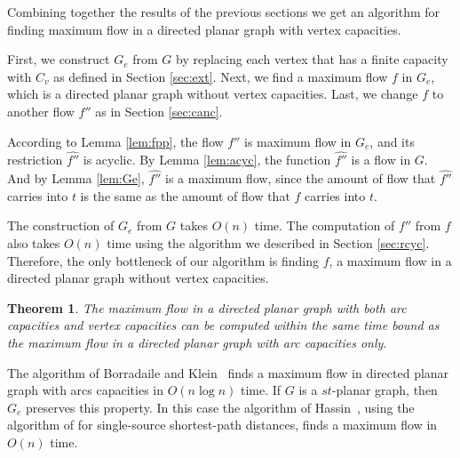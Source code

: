 \documentclass[a4paper,11pt]{article}
\newtheorem{theorem}{Theorem}[section]
\begin{document}
Combining together the results of the previous sections we get an
algorithm for finding maximum flow in a directed planar graph with
vertex capacities.

First, we construct $G_e$ from $G$ by replacing each vertex that has a
finite capacity with $C_v$ as defined in Section \ref{sec:ext}. Next,
we find a maximum flow $f$ in $G_e$, which is a directed planar graph
without vertex capacities.  Last, we change
 $f$ to another flow $f''$ as in Section \ref{sec:canc}.

According to
Lemma \ref{lem:fpp}, the flow $f''$ is maximum flow in $G_e$, and
 its restriction $\hat{f''}$ is acyclic.
 By Lemma \ref{lem:acyc}, the function $\hat{f''}$ is a flow in
 $G$. And by Lemma \ref{lem:Ge}, $\hat{f''}$ is a maximum flow, since the amount of
 flow that $\hat{f''}$ carries into $t$ is the same as the amount of
 flow that $f$ carries into $t$.

 The construction of $G_e$ from $G$ takes $O(n)$ time. The computation
 of $f''$ from $f$ also takes $O(n)$ time using the algorithm
we described in Section \ref{sec:rcyc}. Therefore,
 the only bottleneck of our algorithm is finding $f$, a maximum flow
 in a directed planar graph without vertex capacities.

\begin{theorem}
  The maximum flow in a directed planar graph with both arc capacities
  and vertex capacities can be computed within the same time bound as the
  maximum flow in a directed planar graph with  arc capacities only.
\end{theorem}

The algorithm of Borradaile and Klein~\cite{BK} finds a maximum flow
in directed planar graph with arcs capacities in $O(n\log n)$ time. If
$G$ is a $st$-planar graph, then $G_e$ preserves this property. In
this case the algorithm of Hassin~\cite{H81}, using the algorithm of
\cite{HKRS97} for single-source shortest-path distances, finds a
maximum flow in $O(n)$ time.
\end{document}
